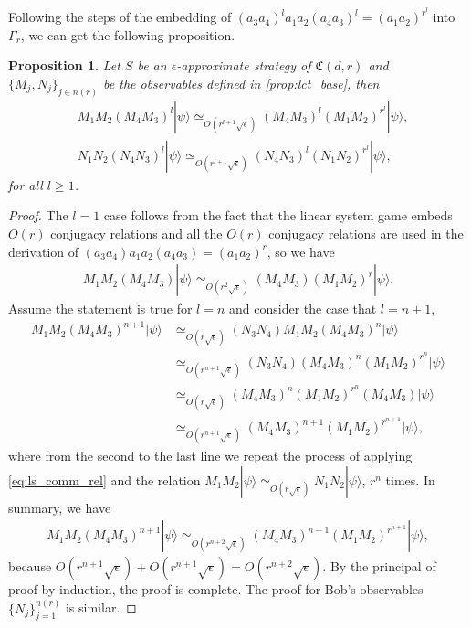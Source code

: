 \documentclass[11pt,letterpaper]{article}
\newcommand{\ket}[1]{|#1\rangle}
\newcommand{\1}{\mathbb{1}}
\newcommand{\nr}{n(r)}
\newcommand{\fC}{\mathfrak{C}}
\newcommand{\ep}{\epsilon}
\newcommand{\se}{\sqrt{\epsilon}}
\newcommand{\appd}[1]{\simeq_{#1}}
\newtheorem{proposition}[theorem]{Proposition}
\theoremstyle{definition}
\begin{document}
Following the steps of the embedding of $(a_3a_4)^l a_1a_2(a_4a_3)^l = (a_1a_2)^{r^l}$ into $\Gamma_r$,
we can get the following proposition.
\begin{proposition}
\label{prop:lct_adv}
Let $S$ be an $\ep$-approximate strategy of $\fC(d,r)$ and $\{M_j, N_j\}_{j \in \nr}$ be the observables defined in 
\cref{prop:lct_base}, 
then
\begin{align}
	&M_1M_2 (M_4M_3)^l \ket{\psi}\appd{O(r^{l+1} \se)} (M_4M_3)^l (M_1M_2)^{r^l} \ket{\psi}, \\
	&N_1N_2 (N_4N_3)^l \ket{\psi}\appd{O(r^{l+1} \se)} (N_4N_3)^l (N_1N_2)^{r^l} \ket{\psi}, 
\end{align}
for all $l \geq 1$.
\end{proposition}
\begin{proof}
The $l = 1$ case follows from the fact that the linear system game embeds $O(r)$ conjugacy relations and 
all the $O(r)$ conjugacy relations are used in the derivation of $(a_3a_4)a_1a_2(a_4a_3) = (a_1a_2)^r$, so we 
have
\begin{align}
	\label{eq:ls_comm_rel}
	M_1M_2 (M_4M_3) \ket{\psi} \appd{O(r^2\se)} (M_4M_3)(M_1M_2)^r \ket{\psi}.
\end{align}
Assume the statement is true for $l = n$ and consider the case that $l = n+1$,
\begin{align*}
	M_1M_2 (M_4M_3)^{n+1} \ket{\psi}  &\appd{O(r\se)} (N_3N_4) M_1M_2(M_4M_3)^n \ket{\psi} \\
	&\appd{O(r^{n+1}\se)} (N_3N_4) (M_4M_3)^n (M_1M_2)^{r^n} \ket{\psi}\\
	&\appd{O(r\se)} (M_4M_3)^n (M_1M_2)^{r^n} (M_4M_3) \ket{\psi} \\
	& \appd{O(r^{n+1} \se)} (M_4M_3)^{n+1} (M_1M_2)^{r^{n+1}} \ket{\psi},
\end{align*}
where from the second to the last line we repeat the process of applying \cref{eq:ls_comm_rel} 
and the relation $M_1M_2 \ket{\psi} \appd{O(r\se)} N_1N_2 \ket{\psi}$, $r^n$ times.
In summary, we have 
\begin{align}
	M_1M_2(M_4M_3)^{n+1} \ket{\psi} \appd{O(r^{n+2} \se)} (M_4M_3)^{n+1} (M_1M_2)^{r^{n+1}}\ket{\psi},
\end{align}
because $O(r^{n+1} \se)+O(r^{n+1}\se) = O(r^{n+2} \se)$.
By the principal of proof by induction, the proof is complete.
The proof for Bob's observables $\{ N_j \}_{j=1}^{\nr}$ is similar.
\end{proof}
\end{document}
